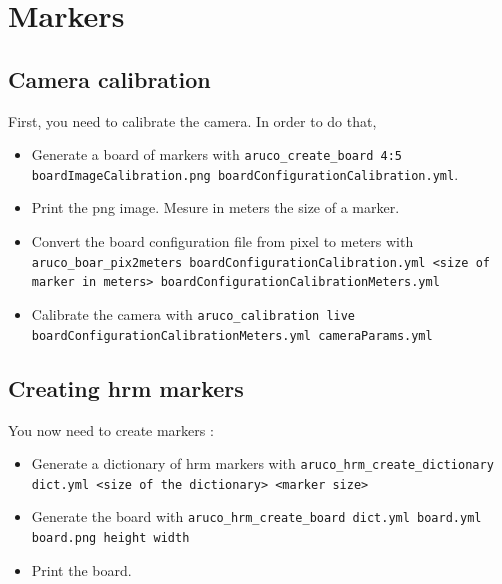 \documentclass[a4paper,11pt]{report}
\begin{document}
\section{Markers}
\label{sec:markers}

\subsection{Camera calibration}
\label{subsec:cam}

First, you need to calibrate the camera. In order to do that, \begin{itemize}

    \item Generate a board of markers with \texttt{aruco\_create\_board 4:5
        boardImageCalibration.png boardConfigurationCalibration.yml}.

    \item Print the png image. Mesure in meters the size of a marker.

    \item Convert the board configuration file from pixel to meters with
        \texttt{aruco\_boar\_pix2meters boardConfigurationCalibration.yml <size
        of marker in meters> boardConfigurationCalibrationMeters.yml}

    \item Calibrate the camera with \texttt{aruco\_calibration live
        boardConfigurationCalibrationMeters.yml cameraParams.yml}

\end{itemize}

\subsection{Creating hrm markers}
\label{subsec:dic}

You now need to create markers : \begin{itemize}

    \item Generate a dictionary of hrm markers with
        \texttt{aruco\_hrm\_create\_dictionary dict.yml <size of the
        dictionary> <marker size>}

    \item Generate the board with \texttt{aruco\_hrm\_create\_board dict.yml
        board.yml board.png height width}

    \item Print the board.

\end{itemize}
\end{document}
